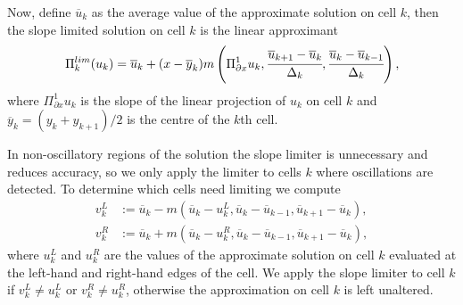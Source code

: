 Now, define \(\overline u_{k}\) as the average value of the approximate solution on cell \(k\), then the slope limited solution on cell \(k\) is the linear approximant 
\begin{align*}
	\Pi_{k}^{lim}(u_k)=\overline u_{k} + (x-\overline y_k)m\left(\Pi^1_{\partial x}u_k,\cfrac{\overline u_{k+1}-\overline u_{k}}{\Delta_k},\cfrac{\overline u_{k}-\overline u_{k-1}}{\Delta_k}\right),
\end{align*}
where \(\Pi^1_{\partial x}u_k\) is the slope of the linear projection of \(u_k\) on cell \(k\) and \(\overline y_k=(y_k+y_{k+1})/2\) is the centre of the \(k\)th cell. 

In non-oscillatory regions of the solution the slope limiter is unnecessary and reduces accuracy, so we only apply the limiter to cells \(k\) where oscillations are detected. To determine which cells need limiting we compute 
\begin{align*}
	v_k^L &:= \overline{u}_{k} - m(\overline{u}_{k} - {u}_{k}^L,\overline{u}_{k}-\overline{u}_{k-1},\overline{u}_{k+1}-\overline{u}_{k}),
	\\v_k^R &:= \overline{u}_{k} + m(\overline{u}_{k} - {u}_{k}^R,\overline{u}_{k}-\overline{u}_{k-1},\overline{u}_{k+1}-\overline{u}_{k}),
\end{align*}
where \({u}_{k}^L\) and \({u}_{k}^R\) are the values of the approximate solution on cell \(k\) evaluated at the left-hand and right-hand edges of the cell. We apply the slope limiter to cell \(k\) if \(v_k^L\neq u_k^L\) or \(v_k^R\neq u_k^R\), otherwise the approximation on cell \(k\) is left unaltered. 



